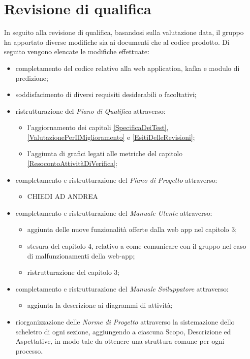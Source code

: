 \section{Revisione di qualifica}\label{EsitiDelleRevisioniRevisioneDiQualifica}
In seguito alla revisione di qualifica, basandosi sulla valutazione data, il gruppo ha apportato diverse modifiche sia ai documenti che al codice prodotto. Di seguito vengono elencate le modifiche effettuate:
\begin{itemize}
		\item completamento del codice relativo alla web application, kafka e modulo di predizione;
		\item soddisfacimento di diversi requisiti desiderabili o facoltativi;
		\item ristrutturazione del \textit{Piano di Qualifica} attraverso:
	\begin{itemize}
		\item l'aggiornamento dei capitoli \ref{SpecificaDeiTest}, \ref{ValutazionePerIlMiglioramento} e \ref{EsitiDelleRevisioni};
		\item l'aggiunta di grafici legati alle metriche del capitolo \ref{ResocontoAttivitàDiVerifica};
	\end{itemize}
	\item completamento e ristrutturazione  del \textit{Piano di Progetto} attraverso:
	\begin{itemize}
		\item CHIEDI AD ANDREA
	\end{itemize}
	\item completamento e ristrutturazione  del \textit{Manuale Utente} attraverso: 
	\begin{itemize}
		\item aggiunta delle nuove funzionalità offerte dalla web app nel capitolo 3;
		\item stesura del capitolo 4, relativo a come comunicare con il gruppo nel caso di malfunzionamenti della web-app;
		\item ristrutturazione del capitolo 3;
	\end{itemize}
\item completamento e ristrutturazione  del \textit{Manuale Sviluppatore} attraverso: 
\begin{itemize}
	\item aggiunta la descrizione ai diagrammi di attività; 
\end{itemize}
\item riorganizzazione delle \textit{Norme di Progetto} attraverso la sistemazione dello scheletro di ogni sezione, aggiungendo a ciascuna Scopo, Descrizione ed Aspettative, in modo tale da ottenere una struttura comune per ogni processo.

\end{itemize}